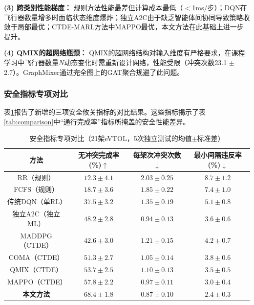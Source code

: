 \documentclass[12pt,a4paper,UTF8]{ctexart}
\begin{document}
\textbf{(3) 跨类别性能梯度：} 规则方法性能最差但计算成本最低（$<$1ms/步）；DQN在飞行器数量增多时面临状态维度爆炸；独立A2C由于缺乏智能体间协同导致策略收敛于局部最优；CTDE-MARL方法中MAPPO最优，本文方法在此基础上进一步提升。

\textbf{(4) QMIX的超网络瓶颈：} QMIX的超网络结构对输入维度有严格要求，在课程学习中飞行器数量$N$动态变化时需重新设计网络，性能受限（冲突次数23.1 $\pm$ 2.7）。GraphMixer通过完全图上的GAT聚合规避了此问题。

\subsubsection{安全指标专项对比}

表\ref{tab:safety_metrics}报告了新增的三项安全攸关指标的对比结果。这些指标揭示了表\ref{tab:comparison}中``通行完成率''指标所掩盖的安全性能差异。

\begin{table}[H]
    \centering
    \caption{安全指标专项对比（21架eVTOL，5次独立测试的均值$\pm$标准差）}
    \label{tab:safety_metrics}
    \begin{tabular}{|c|c|c|c|}
        \hline
        \textbf{方法} & \textbf{无冲突完成率(\%)$\uparrow$} & \textbf{每架次冲突次数$\downarrow$} & \textbf{最小间隔违反率(\%)$\downarrow$} \\
        \hline
        RR（规则） & $12.3 \pm 4.1$ & $2.03 \pm 0.25$ & $8.7 \pm 1.2$ \\
        FCFS（规则） & $18.7 \pm 3.6$ & $1.85 \pm 0.22$ & $7.4 \pm 1.0$ \\
        传统DQN（单RL） & $37.5 \pm 3.2$ & $1.35 \pm 0.19$ & $5.1 \pm 0.8$ \\
        独立A2C（独立ML） & $48.2 \pm 2.8$ & $0.94 \pm 0.13$ & $3.6 \pm 0.6$ \\
        MADDPG（CTDE） & $42.6 \pm 3.0$ & $1.21 \pm 0.15$ & $4.2 \pm 0.7$ \\
        COMA（CTDE） & $51.3 \pm 2.7$ & $1.05 \pm 0.14$ & $3.8 \pm 0.6$ \\
        QMIX（CTDE） & $53.7 \pm 2.5$ & $1.10 \pm 0.13$ & $3.5 \pm 0.5$ \\
        MAPPO（CTDE） & $57.8 \pm 2.2$ & $0.97 \pm 0.11$ & $3.0 \pm 0.4$ \\
        \textbf{本文方法} & $\mathbf{68.4 \pm 1.8}$ & $\mathbf{0.87 \pm 0.10}$ & $\mathbf{2.4 \pm 0.3}$ \\
        \hline
    \end{tabular}
\end{table}
\end{document}
